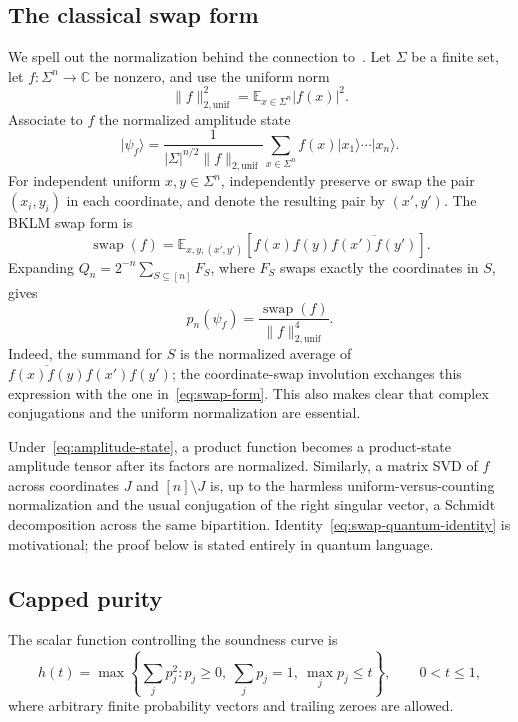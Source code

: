 \documentclass[11pt]{article}
\theoremstyle{definition}
\theoremstyle{remark}
\newcommand{\C}{\mathbb{C}}
\newcommand{\E}{\mathbb{E}}
\newcommand{\swap}{\operatorname{swap}}
\newcommand{\ket}[1]{\lvert #1\rangle}
\begin{document}
\subsection{The classical swap form}

We spell out the normalization behind the connection to~\cite{BKLM24}.
Let $\Sigma$ be a finite set, let $f:\Sigma^n\to\C$ be nonzero, and use
the uniform norm
\[
  \|f\|_{2,\mathrm{unif}}^2
  =\E_{x\in\Sigma^n}|f(x)|^2.
\]
Associate to $f$ the normalized amplitude state
\begin{equation}\label{eq:amplitude-state}
  \ket{\psi_f}
  =\frac{1}{|\Sigma|^{n/2}\|f\|_{2,\mathrm{unif}}}
    \sum_{x\in\Sigma^n} f(x)\ket{x_1}\cdots\ket{x_n}.
\end{equation}
For independent uniform $x,y\in\Sigma^n$, independently preserve or swap
the pair $(x_i,y_i)$ in each coordinate, and denote the resulting pair by
$(x',y')$.  The BKLM swap form is
\begin{equation}\label{eq:swap-form}
  \swap(f)
  =\E_{x,y,(x',y')}
     \left[f(x)f(y)\overline{f(x')f(y')}\right].
\end{equation}
Expanding $Q_n=2^{-n}\sum_{S\subseteq[n]}F_S$, where $F_S$ swaps exactly
the coordinates in $S$, gives
\begin{equation}\label{eq:swap-quantum-identity}
  p_n(\psi_f)
  =\frac{\swap(f)}{\|f\|_{2,\mathrm{unif}}^4}.
\end{equation}
Indeed, the summand for $S$ is the normalized average of
$\overline{f(x)f(y)}f(x')f(y')$; the coordinate-swap involution exchanges
this expression with the one in~\eqref{eq:swap-form}.  This also makes clear
that complex conjugations and the uniform normalization are essential.

Under~\eqref{eq:amplitude-state}, a product function becomes a product-state
amplitude tensor after its factors are normalized.  Similarly, a matrix SVD
of $f$ across coordinates $J$ and $[n]\setminus J$ is, up to the harmless
uniform-versus-counting normalization and the usual conjugation of the
right singular vector, a Schmidt decomposition across the same
bipartition.  Identity~\eqref{eq:swap-quantum-identity} is motivational; the
proof below is stated entirely in quantum language.

\subsection{Capped purity}

The scalar function controlling the soundness curve is
\begin{equation}\label{eq:h-def}
  h(t)=\max\left\{
       \sum_j p_j^2:
       p_j\geq0,\ \sum_jp_j=1,\ \max_jp_j\leq t
     \right\},
  \qquad 0<t\leq1,
\end{equation}
where arbitrary finite probability vectors and trailing zeroes are allowed.
\end{document}
